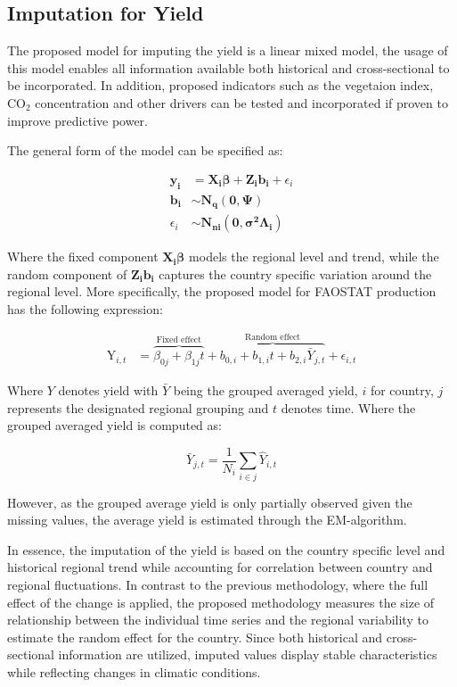 \documentclass[nojss]{jss}\usepackage{graphicx, color}
\begin{document}
\subsection{Imputation for Yield}
The proposed model for imputing the yield is a linear mixed model, the
usage of this model enables all information available both
historical and cross-sectional to be incorporated. In addition,
proposed indicators such as the vegetaion index, $\text{CO}_2$
concentration and other drivers can be tested and incorporated if
proven to improve predictive power.

The general form of the model can be specified as:

\begin{align}
  \mathbf{y_i} &= \mathbf{X_i}\boldsymbol{\beta} +
  \mathbf{Z_i}\mathbf{b_i} + \epsilon_i \nonumber\\
  \mathbf{b_i} &\sim \mathbf{N_q}(\mathbf{0}, \boldsymbol{\Psi})\nonumber\\
  \epsilon_i &\sim \mathbf{N_{ni}}(\mathbf{0},
  \boldsymbol{\sigma^2}\boldsymbol{\Lambda_i})
\end{align}

Where the fixed component $\mathbf{X_i}\boldsymbol{\beta}$ models the
regional level and trend, while the random component of
$\mathbf{Z_i}\mathbf{b_i}$ captures the country specific variation
around the regional level.  More specifically, the proposed model for
FAOSTAT production has the following expression:

\begin{align}
  \label{eq:lmeImpute}
  \text{Y}_{i,t} &= \overbrace{\beta_{0j} + \beta_{1j}t}^{\text{Fixed
      effect}} + \overbrace{b_{0,i} + b_{1,i}t +
    b_{2,i}\bar{Y}_{j,t}}^{\text{Random effect}} + \epsilon_{i,t}
\end{align}

Where $Y$ denotes yield with $\bar{Y}$ being the grouped averaged
yield, $i$ for country, $j$ represents the designated regional
grouping and $t$ denotes time. Where the grouped averaged yield is
computed as:

\begin{equation}
  \label{eq:averageYield}
  \bar{Y}_{j, t} = \frac{1}{N_i}\sum_{i \in j} \hat{Y}_{i,t}
\end{equation}

However, as the grouped average yield is only partially observed
given the missing values, the average yield is estimated through the
EM-algorithm.


In essence, the imputation of the yield is based on the country
specific level and historical regional trend while accounting for
correlation between country and regional fluctuations. In contrast to
the previous methodology, where the full effect of the change is
applied, the proposed methodology measures the size of relationship
between the individual time series and the regional variability to
estimate the random effect for the country. Since both historical and
cross-sectional information are utilized, imputed values display
stable characteristics while reflecting changes in climatic
conditions.
\end{document}
